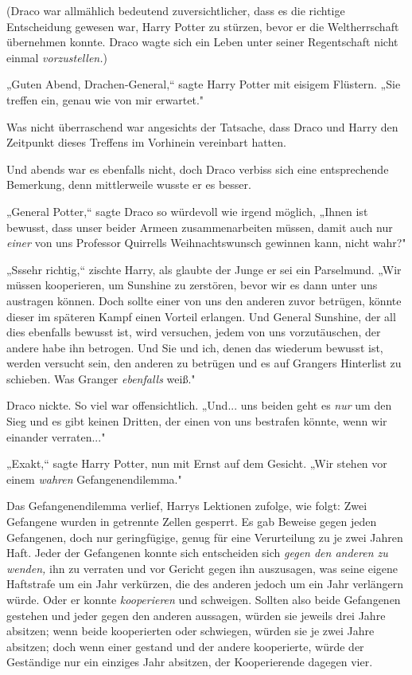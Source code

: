 {(Draco war allmählich bedeutend zuversichtlicher, dass es die richtige Entscheidung gewesen war, Harry Potter zu stürzen, bevor er die Weltherrschaft übernehmen konnte. Draco wagte sich ein Leben unter seiner Regentschaft nicht einmal \emph{vorzustellen.})

„Guten Abend, Drachen-General,“ sagte Harry Potter mit eisigem Flüstern. „Sie treffen ein, genau wie von mir erwartet."

Was nicht überraschend war angesichts der Tatsache, dass Draco und Harry den Zeitpunkt dieses Treffens im Vorhinein vereinbart hatten.

Und abends war es ebenfalls nicht, doch Draco verbiss sich eine entsprechende Bemerkung, denn mittlerweile wusste er es besser.

„General Potter,“ sagte Draco so würdevoll wie irgend möglich, „Ihnen ist bewusst, dass unser beider Armeen zusammenarbeiten müssen, damit auch nur \emph{einer} von uns Professor Quirrells Weihnachtswunsch gewinnen kann, nicht wahr?"

„Sssehr richtig,“ zischte Harry, als glaubte der Junge er sei ein Parselmund. „Wir müssen kooperieren, um Sunshine zu zerstören, bevor wir es dann unter uns austragen können. Doch sollte einer von uns den anderen zuvor betrügen, könnte dieser im späteren Kampf einen Vorteil erlangen. Und General Sunshine, der all dies ebenfalls bewusst ist, wird versuchen, jedem von uns vorzutäuschen, der andere habe ihn betrogen. Und Sie und ich, denen das wiederum bewusst ist, werden versucht sein, den anderen zu betrügen und es auf Grangers Hinterlist zu schieben. Was Granger \emph{ebenfalls} weiß."

Draco nickte. So viel war offensichtlich. „Und... uns beiden geht es \emph{nur} um den Sieg und es gibt keinen Dritten, der einen von uns bestrafen könnte, wenn wir einander verraten..."

„Exakt,“ sagte Harry Potter, nun mit Ernst auf dem Gesicht. „Wir stehen vor einem \emph{wahren} Gefangenendilemma."

Das Gefangenendilemma verlief, Harrys Lektionen zufolge, wie folgt: Zwei Gefangene wurden in getrennte Zellen gesperrt. Es gab Beweise gegen jeden Gefangenen, doch nur geringfügige, genug für eine Verurteilung zu je zwei Jahren Haft. Jeder der Gefangenen konnte sich entscheiden sich \emph{gegen den anderen zu wenden,} ihn zu verraten und vor Gericht gegen ihn auszusagen, was seine eigene Haftstrafe um ein Jahr verkürzen, die des anderen jedoch um ein Jahr verlängern würde. Oder er konnte \emph{kooperieren} und schweigen. Sollten also beide Gefangenen gestehen und jeder gegen den anderen aussagen, würden sie jeweils drei Jahre absitzen; wenn beide kooperierten oder schwiegen, würden sie je zwei Jahre absitzen; doch wenn einer gestand und der andere kooperierte, würde der Geständige nur ein einziges Jahr absitzen, der Kooperierende dagegen vier.

}
